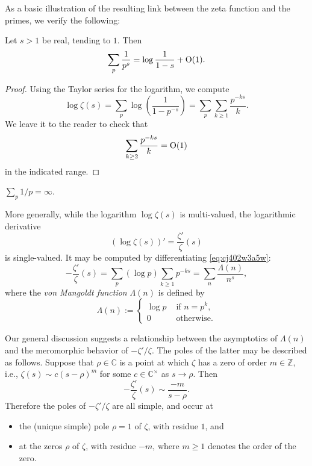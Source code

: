 \documentclass[reqno]{amsart}  \numberwithin{theorem}{section} \numberwithin{equation}{section}
\begin{document}
As a basic illustration of the resulting link between the zeta function and the primes, we verify the following:
\begin{lemma}
  Let $s > 1$ be real, tending to $1$.  Then
  \begin{equation*}
\sum_p \frac{1}{ p^s } = \log \frac{1}{1 - s} + \operatorname{O}(1).
\end{equation*}
\end{lemma}
\begin{proof}
  Using the Taylor series for the logarithm, we compute
  \begin{equation}\label{eq:cj402w3a5w}
    \log \zeta (s) = \sum_p \log \left( \frac{1}{1 - p^{- s}} \right)
    =
    \sum_p \sum_{k \geq 1} \frac{p^{- k s }}{ k}.
  \end{equation}
  We leave it to the reader to check that
  \begin{equation}
\sum_{k \geq 2} \frac{p^{- k s}}{ k }  = \operatorname{O}(1)
  \end{equation}
  in the indicated range.
\end{proof}
\begin{corollary}
$\sum_p 1 / p = \infty$.
\end{corollary}

More generally, while the logarithm $\log \zeta(s)$ is multi-valued, the logarithmic derivative
\begin{equation*}
  \left( \log \zeta(s) \right) '
  = \frac{\zeta '}{\zeta } (s) 
\end{equation*}
is single-valued.  It may be computed by differentiating \eqref{eq:cj402w3a5w}:
\begin{equation*}
- \frac{\zeta '}{ \zeta } (s) = \sum _p (\log p) \sum_{k \geq 1} p^{- k s} = \sum_n \frac{\Lambda(n) }{n^s},
\end{equation*}
where the \emph{von Mangoldt function} $\Lambda(n)$ is defined by
\begin{equation*}
\Lambda(n) :=
\begin{cases}
\log p & \text{ if } n = p ^k, \\
0 & \text{ otherwise.}
\end{cases}
\end{equation*}


Our general discussion suggests a relationship between the asymptotics of $\Lambda(n)$ and the meromorphic behavior of $- \zeta ' / \zeta$.  The poles of the latter may be described as follows.  Suppose that $\rho \in \mathbb{C}$ is a point at which $\zeta$ has a zero of order $m \in \mathbb{Z}$, i.e., $\zeta(s) \sim c (s - \rho)^m$ for some $c \in \mathbb{C}^\times$ as $s \rightarrow \rho$.  Then
\begin{equation*}
- \frac{\zeta'}{\zeta}(s) \sim \frac{- m }{s - \rho}.
\end{equation*}
Therefore the poles of $- \zeta ' / \zeta $ are all simple, and occur at
\begin{itemize}
\item the (unique simple) pole $\rho = 1$ of $\zeta$, with residue $1$, and
\item at the zeros $\rho$ of $\zeta$, with residue $-m$, where $m \geq 1$ denotes the order of the zero.
\end{itemize}
\end{document}
